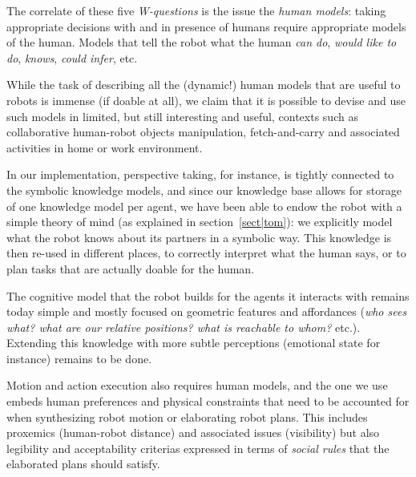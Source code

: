 \documentclass[preprint,3p,times]{elsarticle}
\begin{document}
The correlate of these five \emph{W-questions} is the issue the \emph{human
models}: taking appropriate decisions with and in presence of humans require
appropriate models of the human. Models that tell the robot what the human
\emph{can do}, \emph{would like to do}, \emph{knows}, \emph{could infer}, etc.

While the task of describing all the (dynamic!) human models that are useful to
robots is immense (if doable at all), we claim that it is possible to devise and
use such models in limited, but still interesting and useful, contexts such as
collaborative human-robot objects manipulation, fetch-and-carry and associated
activities in home or work environment.

In our implementation, perspective taking, for instance, is tightly connected to
the symbolic knowledge models, and since our knowledge base allows for storage
of one knowledge model per agent, we have been able to endow the robot with a
simple theory of mind (as explained in section~\ref{sect|tom}): we explicitly
model what the robot knows about its partners in a symbolic way. This knowledge
is then re-used in different places, to correctly interpret what the human says,
or to plan tasks that are actually doable for the human.

The cognitive model that the robot builds for the agents it interacts with
remains today simple and mostly focused on geometric features and affordances
(\emph{who sees what? what are our relative positions? what is reachable to
whom?}  etc.). Extending this knowledge with more subtle perceptions (emotional
state for instance) remains to be done.

Motion and action execution also requires human models, and the one we use
embeds human preferences and physical constraints that need to be accounted for
when synthesizing robot motion or elaborating robot plans. This includes
proxemics (human-robot distance) and associated issues (visibility) but also
legibility and acceptability criterias expressed in terms of \emph{social rules}
that the elaborated plans should satisfy.
\end{document}
